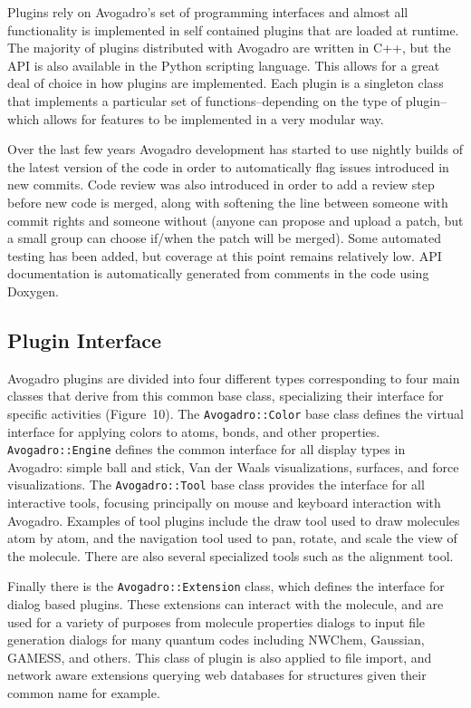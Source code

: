 \documentclass[10pt]{bmc_article}
\newenvironment{bmcformat}{\begin{raggedright}
  \baselineskip20pt\sloppy\setboolean{publ}{false}}{\end{raggedright}
  \baselineskip20pt\sloppy}
\begin{document}
\begin{bmcformat}
Plugins rely on Avogadro's set of programming interfaces and almost
all functionality is implemented in self contained plugins that are
loaded at runtime. The majority of plugins distributed with Avogadro
are written in C++, but the API is also available in the Python
scripting language. This allows for a great deal of choice in how
plugins are implemented. Each plugin is a singleton class that
implements a particular set of functions--depending on the type of
plugin--which allows for features to be implemented in a very modular
way.

Over the last few years Avogadro development has started to use nightly builds
of the latest version of the code in order to automatically flag issues
introduced in new commits. Code review was also introduced in order to add a
review step before new code is merged, along with softening the line between
someone with commit rights and someone without (anyone can propose and upload
a patch, but a small group can choose if/when the patch will be merged). Some
automated testing has been added, but coverage at this point remains relatively
low. API documentation is automatically generated from comments in the code
using Doxygen.

\subsection*{Plugin Interface}

Avogadro plugins are divided into four different types corresponding
to four main classes
that derive from this common base class, specializing
their interface for specific activities
(Figure~10). The {\tt Avogadro::Color} base class
defines the virtual interface for applying colors to atoms, bonds, and other properties.
 {\tt Avogadro::Engine} defines the common interface for all display types in Avogadro:
simple ball and stick, Van der Waals visualizations,
surfaces, and force visualizations. The {\tt Avogadro::Tool} base class provides
the interface for all interactive tools, focusing principally on mouse and
keyboard interaction with Avogadro. Examples of tool plugins include the draw
tool used to draw molecules atom by atom, and the navigation tool used to pan,
rotate, and scale the view of the molecule. There are also several specialized
tools such as the alignment tool.

Finally there is the {\tt Avogadro::Extension} class, which defines the interface for
dialog based plugins. These extensions can interact with the molecule, and are
used for a variety of purposes from molecule properties dialogs to input file
generation dialogs for many quantum codes including NWChem, Gaussian, GAMESS, and
others. This class of plugin is also applied to file import, and network aware
extensions querying web databases for structures given their common name for
example.


\end{bmcformat}
\end{document}
